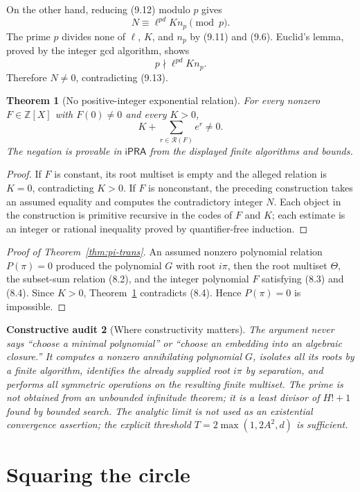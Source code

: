 \documentclass[11pt]{article}
\newtheorem{theorem}{Theorem}[section]
\newtheorem{audit}[theorem]{Constructive audit}
\newcommand{\Z}{\mathbb{Z}}
\newcommand{\ipra}{\mathsf{iPRA}}
\begin{document}
On the other hand, reducing (9.12) modulo $p$ gives
\[
  N\equiv \ell^{pd}K n_p\pmod p.
\]
The prime $p$ divides none of $\ell$, $K$, and $n_p$ by (9.11) and (9.6).  Euclid's lemma, proved by the integer gcd algorithm, shows
\[
  p\nmid\ell^{pd}K n_p.
\]
Therefore $N\ne0$, contradicting (9.13).

\begin{theorem}[No positive-integer exponential relation]\label{thm:no-exp-relation}
For every nonzero $F\in\Z[X]$ with $F(0)\ne0$ and every $K>0$,
\[
  K+\sum_{r\in\mathcal R(F)}e^r\ne0.
\]
The negation is provable in $\ipra$ from the displayed finite algorithms and bounds.
\end{theorem}

\begin{proof}
If $F$ is constant, its root multiset is empty and the alleged relation is $K=0$, contradicting $K>0$.  If $F$ is nonconstant, the preceding construction takes an assumed equality and computes the contradictory integer $N$.  Each object in the construction is primitive recursive in the codes of $F$ and $K$; each estimate is an integer or rational inequality proved by quantifier-free induction.
\end{proof}

\begin{proof}[Proof of Theorem~\ref{thm:pi-trans}]
An assumed nonzero polynomial relation $P(\pi)=0$ produced the polynomial $G$ with root $i\pi$, then the root multiset $\Theta$, the subset-sum relation (8.2), and the integer polynomial $F$ satisfying (8.3) and (8.4).  Since $K>0$, Theorem~\ref{thm:no-exp-relation} contradicts (8.4).  Hence $P(\pi)=0$ is impossible.
\end{proof}

\begin{audit}[Where constructivity matters]
The argument never says ``choose a minimal polynomial'' or ``choose an embedding into an algebraic closure.''  It computes a nonzero annihilating polynomial $G$, isolates all its roots by a finite algorithm, identifies the already supplied root $i\pi$ by separation, and performs all symmetric operations on the resulting finite multiset.  The prime is not obtained from an unbounded infinitude theorem; it is a least divisor of $H!+1$ found by bounded search.  The analytic limit is not used as an existential convergence assertion; the explicit threshold $T=2\max(1,2A^2,d)$ is sufficient.
\end{audit}

\section{Squaring the circle}
\end{document}
